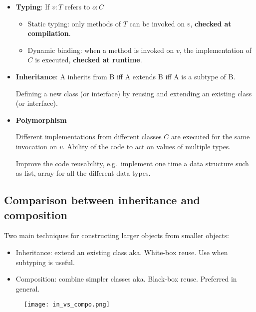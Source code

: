 \begin{itemize}

    \item \textbf{Typing}: If $v: T$ refers to $o: C$
        \begin{itemize}
        \item Static typing: only methods of $T$ can be invoked on $v$,
            \textbf{checked at compilation}.

        \item Dynamic binding: when a method is invoked on $v$, the
    implementation of $C$ is executed, \textbf{checked at runtime}. 
    \end{itemize}

    \item \textbf{Inheritance}: A inherits from B iff A extends B iff A is a subtype of B.

        Defining a new class (or interface) by reusing and extending an
        existing class (or interface). 

    \item \textbf{Polymorphism}

        Different implementations from different classes $C$ are
        executed for the same invocation on $v$. Ability of the code to
        act on values of multiple types.

        Improve the code reusability, e.g.\ implement one time a data
        structure such as list, array for all the different data types.

\end{itemize}

\subsection{Comparison between inheritance and composition}

Two main techniques for constructing larger objects from smaller objects:

\begin{itemize}
    \item Inheritance: extend an existing class aka. White-box reuse. Use when subtyping is
useful.

    \item Composition: combine simpler classes aka. Black-box reuse. Preferred in general.
\end{itemize}

\begin{figure}[!ht]
    \centering
    \texttt{[image: in\_vs\_compo.png]}
\end{figure}


